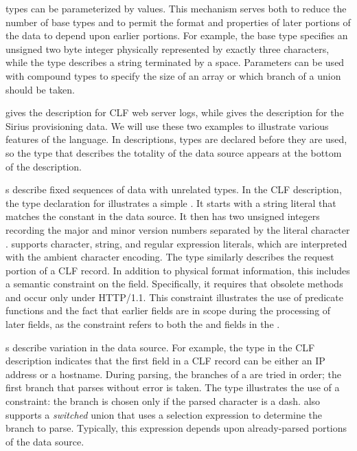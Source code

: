\documentclass[times]{acm-sigplan}
\newcommand{\dibbler}{Sirius}
\begin{document}
\pads{} types can be parameterized by values.
This mechanism
serves both to reduce the number of base types and to permit the
format and properties of later portions of the data to depend upon earlier portions.
For example, 
the base type  specifies an unsigned two byte integer
physically represented by exactly three characters, while the type
describes a string terminated by a space.  Parameters can be 
used with compound types to specify the size of an array or which
branch of a union should be taken.




 gives the \pads{} description for CLF web server logs, 
while  gives the description for the \dibbler{} 
provisioning data.  We will use these two examples to illustrate various 
features of the \pads{} language.  In \pads{} descriptions, types are declared before they are used, so the type that describes the totality of the data source appears at the bottom of the description.

s describe fixed sequences of data with unrelated types.
In the CLF description, the type declaration for
 illustrates a simple . It starts with a 
string literal that matches the constant  in the data source.  It 
then has two unsigned integers recording the major and minor version numbers
separated by the literal character .  \pads{} supports character, string,
and regular expression literals, which are interpreted with the ambient character 
encoding. The type  
similarly describes the request portion of a CLF record.  In addition
to physical format information, this  includes a semantic constraint
on the  field.  Specifically, it requires that obsolete methods
 and  occur only under HTTP/1.1.  This constraint illustrates
the use of predicate functions and the fact 
that earlier fields are in scope during the processing of later fields, as the 
constraint
refers to both the  and  fields in the .

s describe variation in the data source.  For example, the
 type in the CLF description indicates that the first field 
in a CLF record can be either an IP address or a hostname.  During parsing, 
the branches of a  are tried in order; the first branch that 
parses without error is taken.  The  type illustrates the use
of a constraint: the branch  is chosen only if the parsed
character is a dash.  \pads{} also supports a \textit{switched} union that uses a selection expression to determine the branch to parse.  Typically, this expression depends upon already-parsed portions of the data source.
\end{document}
